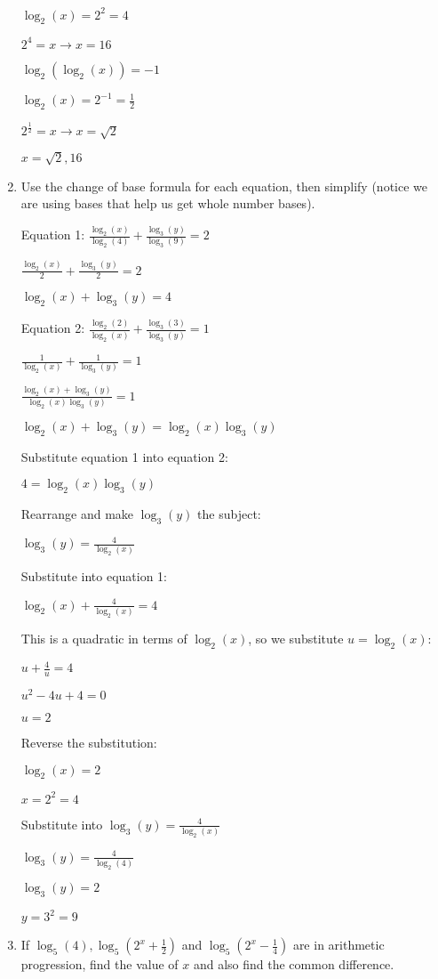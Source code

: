 \documentclass[../main.tex]{subfiles}
\begin{document}
\begin{enumerate}[itemsep=0.4cm]
    \(\log_2(x)=2^2=4\)

    \(2^4=x \rightarrow x=16\)

    \(\log_2(\log_2(x))=-1\)

    \(\log_2(x)=2^{-1}=\frac{1}{2}\)

    \(2^{\frac{1}{2}}=x \rightarrow x=\sqrt{2}\)

    \(x=\sqrt{2}, 16\)

    \item 
    Use the change of base formula for each equation, then simplify (notice we are using bases that help us get whole number bases).

    Equation 1: \(\frac{\log_2(x)}{\log_2(4)}+\frac{\log_3(y)}{\log_3(9)}=2\)

    \(\frac{\log_2(x)}{2}+\frac{\log_3(y)}{2}=2\)

    \(\log_2(x)+\log_3(y)=4\)

    Equation 2: $\frac{\log_2(2)}{\log_2(x)}+\frac{\log_3(3)}{\log_3(y)}=1$

    $\frac{1}{\log_2(x)}+\frac{1}{\log_3(y)}=1$

    $\frac{\log_2(x)+\log_3(y)}{\log_2(x)\log_3(y)}=1$

    $\log_2(x)+\log_3(y)=\log_2(x)\log_3(y)$

    Substitute equation 1 into equation 2:

    $4=\log_2(x)\log_3(y)$

    Rearrange and make $\log_3(y)$ the subject:

    $\log_3(y)=\frac{4}{\log_2(x)}$

    Substitute into equation 1:

    $\log_2(x)+\frac{4}{\log_2(x)}=4$

    This is a quadratic in terms of $\log_2(x)$, so we substitute $u=\log_2(x)$:

    $u+\frac{4}{u}=4$

    $u^2-4u+4=0$

    $u=2$

    Reverse the substitution:

    $\log_2(x)=2$

    $x=2^2=4$

    Substitute into $\log_3(y)=\frac{4}{\log_2(x)}$

    $\log_3(y)=\frac{4}{\log_2(4)}$

    $\log_3(y)=2$

    $y=3^2=9$

    \item 
    If $\log_5(4), \log_5(2^x+\frac{1}{2})$ and $\log_5(2^x-\frac{1}{4})$ are in arithmetic progression, find the value of $x$ and also find the common difference.


\end{enumerate}
\end{document}
